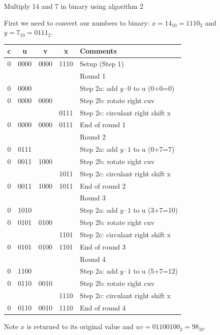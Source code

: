 \begin{example}
Multiply 14 and 7 in binary using algorithm 2

{\color{ans}
First we need to convert our numbers to binary: $x=14_{10} = 1110_2$ and $y=7_{10} = 0111_2$.

\begin{tabular}{ccccp{2in}}
c & u    & v    & x    & Comments  \\\hline
0 & 0000 & 0000 & 1110 & Setup (Step 1) \\\hline
  &      &      &      & Round 1\\
0 & 0000 &      &      & Step 2a: add $y\cdot 0$ to u (0+0=0) \\
0 & 0000 & 0000 &      & Step 2b: rotate right cuv \\
  &      &      & 0111 & Step 2c: circulant right shift x \\
0 & 0000 & 0000 & 0111 & End of round 1 \\\hline
  &      &      &      & Round 2\\
0 & 0111 &      &      & Step 2a: add $y\cdot 1$ to u (0+7=7) \\
0 & 0011 & 1000 &      & Step 2b: rotate right cuv \\
  &      &      & 1011 & Step 2c: circulant right shift x \\
0 & 0011 & 1000 & 1011 & End of round 2 \\\hline
  &      &      &      & Round 3\\
0 & 1010 &      &      & Step 2a: add $y\cdot 1$ to u (3+7=10) \\
0 & 0101 & 0100 &      & Step 2b: rotate right cuv \\
  &      &      & 1101 & Step 2c: circulant right shift x \\
0 & 0101 & 0100 & 1101 & End of round 3 \\\hline
  &      &      &      & Round 4\\
0 & 1100 &      &      & Step 2a: add $y\cdot 1$ to u (5+7=12) \\
0 & 0110 & 0010 &      & Step 2b: rotate right cuv \\
  &      &      & 1110 & Step 2c: circulant right shift x \\
0 & 0110 & 0010 & 1110 & End of round 4 \\\hline
\end{tabular}

Note $x$ is returned to its original value and $uv = 01100100_2 = 98_{10}$.
}
\end{example}

